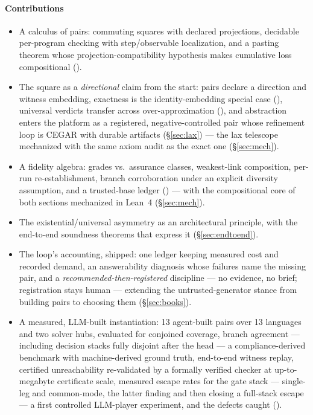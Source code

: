 \paragraph{Contributions}
\begin{itemize}
\item A calculus of pairs: commuting squares with declared projections,
  decidable per-program checking with step/observable localization, and a
  pasting theorem whose projection-compatibility hypothesis makes
  cumulative loss compositional ().
\ifarxiv
\item The square as a \emph{directional} claim from the start: pairs
  declare a direction and witness embedding, exactness is the
  identity-embedding special case (), universal
  verdicts transfer across over-approximation (), and
  abstraction enters the platform as a registered, negative-controlled
  pair whose refinement loop is CEGAR with durable artifacts
  (\S\ref{sec:lax}) --- the lax telescope mechanized with the same
  axiom audit as the exact one (\S\ref{sec:mech}).
\fi
\item A fidelity algebra: grades vs.\ assurance classes, weakest-link
  composition, per-run re-establishment, branch corroboration under an
  explicit diversity assumption, and a trusted-base ledger
  () --- with the compositional core of both
  sections mechanized in Lean~4 (\S\ref{sec:mech}).
\item The existential/universal asymmetry as an architectural principle,
  with the end-to-end soundness theorems that express it
  (\S\ref{sec:endtoend}).
\ifarxiv
\item The loop's accounting, shipped: one ledger keeping measured cost
  and recorded demand, an answerability diagnosis whose failures name
  the missing pair, and a \emph{recommended-then-registered} discipline
  --- no evidence, no brief; registration stays human --- extending the
  untrusted-generator stance from building pairs to choosing them
  (\S\ref{sec:books}).
\fi
\item A measured, LLM-built instantiation: 13 agent-built pairs over
  13 languages and two solver hubs, evaluated for conjoined coverage,
  branch agreement --- including decision stacks fully disjoint after
  the head --- a compliance-derived benchmark with machine-derived
  ground truth, end-to-end witness replay, certified unreachability
  re-validated by a formally verified checker at up-to-megabyte
  certificate scale, measured escape rates for the gate stack ---
  single-leg and common-mode, the latter finding and then closing a
  full-stack escape --- a
  first controlled LLM-player experiment, and the defects caught
  ().
\end{itemize}

